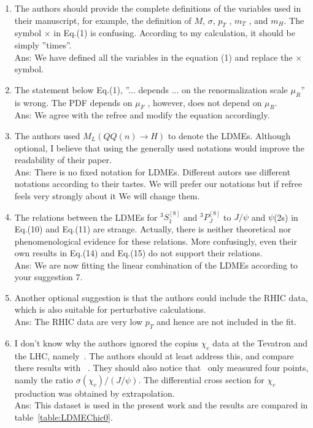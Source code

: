 \documentclass[aps,prc,preprint,superscriptaddress,showpacs,showkeys,amsmath]{revtex4-1}
\begin{document}
\begin{enumerate}

\item The authors should provide the complete definitions of the variables used in their
manuscript, for example, the definition of $M$, $\sigma$, $p_T$ , $m_T$ , and $m_H$. 
The symbol $\times$ in Eq.(1) is confusing. According to my calculation, it should be 
simply ”times”.\\
{\color{blue}
Ans: We have defined all the variables in the equation (1) and replace the $\times$
symbol. 
}
\item The statement below Eq.(1), ”... depends ... on the renormalization scale $\mu_R$” 
is wrong. The PDF depends on $\mu_F$ , however, does not depend on $\mu_R$. \\
{\color{blue}
Ans: We agree with the refree and modify the equation accordingly.
}
\item The authors used $M_L(QQ(n) \rightarrow H)$ to denote the LDMEs. Although optional, 
I believe that using the generally used notations would improve the readability of 
their paper. \\
{\color{blue}
Ans: There is no fixed notation for LDMEs. Different autors use different notations according to
their tastes. We will prefer our notations but if refree feels very strongly about it We will 
change them. 
}

\item The relations between the LDMEs for $^3S_1^{[8]}$ and $^3P^{[8]}_J$ to $J/\psi$  
and  $\psi$(2s) in Eq.(10) and Eq.(11) are strange. Actually, there is neither 
theoretical nor phenomenological evidence for these relations. More confusingly, 
even their own results in Eq.(14) and Eq.(15) do not support their relations.\\
{\color{blue}
Ans: We are now fitting the linear combination of the LDMEs according to your suggestion
7.
}
\item Another optional suggestion is that the authors could include the RHIC data, 
  which is also suitable for perturbative calculations.\\
  {\color{blue}
    Ans: The RHIC data are very low $p_{T}$ and hence are not included in the fit.
  }


\item I don’t know why the authors ignored the copius $\chi_c$ data at the Tevatron 
and the LHC, namely~\cite{LHCb:2012af,Aaij:2013dja,Chatrchyan:2012ub,ATLAS:2014ala}. The authors 
should at least address this, and compare there results with ~\cite{Jia:2014jfa}. They should also notice that~\cite{Abe:1997yz} 
only measured four points, namly the ratio $\sigma(\chi_c)/(J/\psi)$. The differential 
cross section for $\chi_c$ production was obtained by extrapolation. \\
{\color{blue}
Ans: This dataset is used in the present work and the results are compared in table~\ref{table:LDMEChic0}.
}


\end{enumerate}
\end{document}
